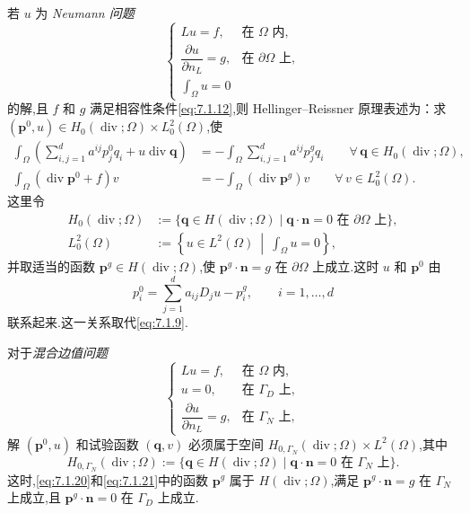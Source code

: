 若 \(u\) 为 \emph{Neumann 问题}
\[
  \begin{cases}
    Lu=f,&\text{在 }\Omega\text{ 内},\\
    \dfrac{\partial u}{\partial n_L}=g,&\text{在 }\partial\Omega\text{ 上},\\
    \displaystyle\int_\Omega u=0&
  \end{cases}
\]
的解,且 \(f\) 和 \(g\) 满足相容性条件\eqref{eq:7.1.12},则 Hellinger--Reissner 原理表述为：求 \((\boldsymbol{p}^0,u)\in H_0(\operatorname{div};\Omega)\times L_0^2(\Omega)\),使
\begin{align}
  \int_\Omega\left(\sum_{i,j=1}^d a^{ij}p_j^0q_i+u\operatorname{div}\boldsymbol{q}\right)
    &=-\int_\Omega\sum_{i,j=1}^d a^{ij}p_j^gq_i
    \qquad\forall\,\boldsymbol{q}\in H_0(\operatorname{div};\Omega),\label{eq:7.1.20}\\
  \int_\Omega(\operatorname{div}\boldsymbol{p}^0+f)v
    &=-\int_\Omega(\operatorname{div}\boldsymbol{p}^g)v
    \qquad\forall\,v\in L_0^2(\Omega).\label{eq:7.1.21}
\end{align}
这里令
\[
  \begin{aligned}
    H_0(\operatorname{div};\Omega)&:=
      \{\boldsymbol{q}\in H(\operatorname{div};\Omega)\mid
          \boldsymbol{q}\cdot\boldsymbol{n}=0\text{ 在 }\partial\Omega\text{ 上}\},\\
    L_0^2(\Omega)&:=\left\{u\in L^2(\Omega)\ \middle|\ \int_\Omega u=0\right\},
  \end{aligned}
\]
并取适当的函数 \(\boldsymbol{p}^g\in H(\operatorname{div};\Omega)\),使 \(\boldsymbol{p}^g\cdot\boldsymbol{n}=g\) 在 \(\partial\Omega\) 上成立.这时 \(u\) 和 \(\boldsymbol{p}^0\) 由
\[
  p_i^0=\sum_{j=1}^d a_{ij}D_ju-p_i^g,\qquad i=1,\ldots,d
\]
联系起来.这一关系取代\eqref{eq:7.1.9}.

对于\emph{混合边值问题}
\[
  \begin{cases}
    Lu=f,&\text{在 }\Omega\text{ 内},\\
    u=0,&\text{在 }\Gamma_D\text{ 上},\\
    \dfrac{\partial u}{\partial n_L}=g,&\text{在 }\Gamma_N\text{ 上},
  \end{cases}
\]
解 \((\boldsymbol{p}^0,u)\) 和试验函数 \((\boldsymbol{q},v)\) 必须属于空间 \(H_{0,\Gamma_N}(\operatorname{div};\Omega)\times L^2(\Omega)\),其中
\[
  H_{0,\Gamma_N}(\operatorname{div};\Omega):=
    \{\boldsymbol{q}\in H(\operatorname{div};\Omega)\mid\boldsymbol{q}\cdot\boldsymbol{n}=0
      \text{ 在 }\Gamma_N\text{ 上}\}.
\]
这时,\eqref{eq:7.1.20}和\eqref{eq:7.1.21}中的函数 \(\boldsymbol{p}^g\) 属于 \(H(\operatorname{div};\Omega)\),满足 \(\boldsymbol{p}^g\cdot\boldsymbol{n}=g\) 在 \(\Gamma_N\) 上成立,且 \(\boldsymbol{p}^g\cdot\boldsymbol{n}=0\) 在 \(\Gamma_D\) 上成立.

